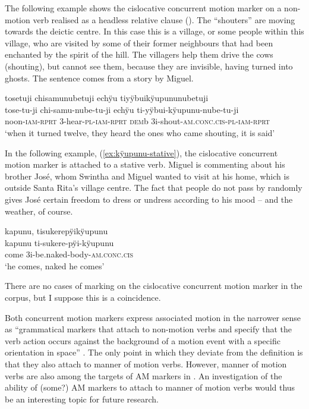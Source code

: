 The following example shows the cislocative concurrent motion marker on a non-motion verb realised as a headless relative clause (). The “shouters” are moving towards the deictic centre. In this case this is a village, or some people within this village, who are visited by some of their former neighbours that had been enchanted by the spirit of the hill. The villagers help them drive the cows (shouting), but cannot see them, because they are invisible, having turned into ghosts. The sentence comes from a story by Miguel.

\ea\label{ex:kÿupunu-non.mot-2}
\begingl 
\glpreamble tosetuji chisamunubetuji echÿu tiyÿbuikÿupununubetuji\\
\gla tose-tu-ji chi-samu-nube-tu-ji echÿu ti-yÿbui-kÿupunu-nube-tu-ji\\ 
\glb noon-\textsc{iam}-\textsc{rprt} 3-hear-\textsc{pl}-\textsc{iam}-\textsc{rprt} \textsc{dem}b 3i-shout-\textsc{am.conc.cis}-\textsc{pl}-\textsc{iam}-\textsc{rprt}\\ 
\glft ‘when it turned twelve, they heard the ones who came shouting, it is said’
\trailingcitation{[mxx-n151017l-1.86]}
\xe
 
In the following example, (\ref{ex:kÿupunu-stative}), the cislocative concurrent motion marker is attached to a stative verb. Miguel is commenting about his brother José, whom Swintha and Miguel wanted to visit at his home, which is outside Santa Rita’s village centre. The fact that people do not pass by randomly gives José certain freedom to dress or undress according to his mood – and the weather, of course.

\ea\label{ex:kÿupunu-stative}
\begingl 
\glpreamble kapunu, tisukerepÿikÿupunu\\
\gla kapunu ti-sukere-pÿi-kÿupunu\\ 
\glb come 3i-be.naked-body-\textsc{am.conc.cis}\\ 
\glft ‘he comes, naked he comes’
\trailingcitation{[mox-c110926s-1.107]}
\xe

There are no cases of  marking on the cislocative concurrent motion marker in the corpus, but I suppose this is a coincidence.
 
Both concurrent motion markers express associated motion in the narrower sense as “grammatical markers that attach to non-motion verbs and specify that the verb action occurs against the background of a motion event with a specific orientation in space” \citep[131]{Guillaume2013}. The only point in which they deviate from the definition is that they also attach to  manner of motion verbs. However, manner of motion verbs are also among the targets of AM markers in  \citep[131]{Rose2015}. An investigation of the ability of (some?) AM markers to attach to  manner of motion verbs would thus be an interesting topic for future research.


